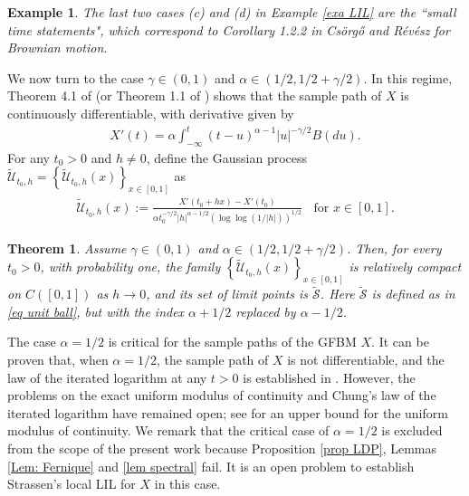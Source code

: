 \documentclass[11pt, reqno]{amsart}
\numberwithin{equation}{section}
\newtheorem{theorem}{Theorem}[section]
\newtheorem{example}{Example}[section]
\newcommand{\1}{{\bf 1}}
\newcommand{\2}{{\bf 2}}
\begin{document}
\begin{example}
  The last two cases  (c) and (d) in  Example \ref{exa LIL} are the ``small time statements", which correspond to Corollary 1.2.2
  in Cs\"{o}rg\H{o}  and R\'ev\'esz \cite{CR} for Brownian motion. 
\end{example}
            
             
 
  {
We now turn to the case $\gamma\in (0,1)$ and $\alpha\in (1/2, 1/2+\gamma/2)$. In this regime,    
Theorem 4.1 of \cite{IPT2021} (or  Theorem 1.1 of \cite{WX2021a}) shows that the sample path of $X$ is continuously differentiable,  
with derivative given by}
\begin{equation*}
\begin{split}
  {X'(t)=\alpha \int_{-\infty}^t (t-u)^{\alpha-1}|u|^{-\gamma/2}B(du). }
\end{split}
\end{equation*} 
         { 
  For any $t_0>0$ and $h\neq 0$,  define the Gaussian process 
   $\widetilde{\mathcal U}_{t_0, h}= \left\{\widetilde{\mathcal U}_{t_0, h}(x)\right\}_{x\in [0,1]}$ as} 
       \begin{align*}\label{eq U'}  {
 \widetilde{\mathcal U}_{t_0, h}(x):=\frac{X'(t_0+hx)-X'(t_0)}{\alpha t_0^{-\gamma/2} |h|^{\alpha-1/2}\left(\log\log(1/|h|)\right)^{1/2}}
  \ \ \ \ \text{for  } x\in [0,1].}
   \end{align*}
           
   \begin{theorem}\label{thm local LIL'}     {Assume $\gamma\in (0,1)$ and $\alpha\in(1/2, 1/2+\gamma/2)$. Then,   for every  $t_0>0$,
   with probability one,  the family $\left\{\widetilde{\mathcal U}_{t_0, h}(x)\right\}_{x\in [0,1]}$  
   is relatively compact on $C([0,1])$  as $h\rightarrow 0$, and its  set of   limit points is $\widetilde{\mathcal S}$.   Here $\widetilde{\mathcal S}$ 
   is defined as in \eqref{eq unit ball}, but with the index $\alpha+1/2$ replaced by $\alpha-1/2$.}
 \end{theorem}
   { 
The case $\alpha = 1/2$ is critical for the sample paths of the GFBM $X$. It can be proven that, when $\alpha = 1/2$, the sample path of $X$ 
is not differentiable, and the law of the iterated logarithm at any $t>0$ is established in \cite[Theorem 1.5]{WX2021a}. However, the problems on  
the exact uniform modulus of continuity and Chung's law of the iterated logarithm have remained open; see \cite[Theorems 1.1]{WX2021a} 
for an upper bound for the uniform modulus of continuity. We remark that the critical case of $\alpha = 1/2$ is excluded from the scope of the 
present work because Proposition \ref{prop LDP}, Lemmas  \ref{Lem: Fernique} and \ref{lem spectral} 
fail. It is an open problem to establish Strassen's local LIL for $X$ in this case.
}
\end{document}
